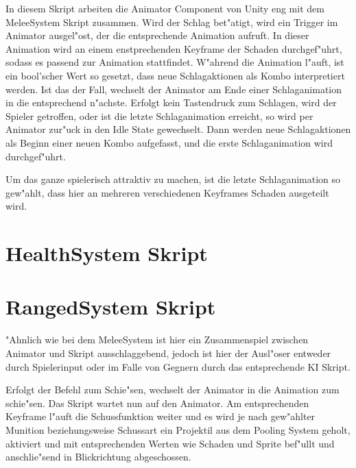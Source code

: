 In diesem Skript arbeiten die Animator Component von Unity eng mit dem MeleeSystem Skript zusammen. Wird der Schlag bet"atigt, wird ein Trigger im Animator ausgel"ost, der die entsprechende Animation aufruft. In dieser Animation wird an einem enstprechenden Keyframe der Schaden durchgef"uhrt, sodass es passend zur Animation stattfindet. W"ahrend die Animation l"auft, ist ein bool'scher Wert so gesetzt, dass neue Schlagaktionen als Kombo interpretiert werden. Ist das der Fall, wechselt der Animator am Ende einer Schlaganimation in die entsprechend n"achste. Erfolgt kein Tastendruck zum Schlagen, wird der Spieler getroffen, oder ist die letzte Schlaganimation erreicht, so wird per Animator zur"uck in den Idle State  gewechselt. Dann werden neue Schlagaktionen als Beginn einer neuen Kombo aufgefasst, und die erste Schlaganimation wird durchgef"uhrt.\newline

Um das ganze spielerisch attraktiv zu machen, ist die letzte Schlaganimation so gew"ahlt, dass hier an mehreren verschiedenen Keyframes Schaden ausgeteilt wird.


\section{HealthSystem Skript}

\section{RangedSystem Skript}
"Ahnlich wie bei dem MeleeSystem ist hier ein Zusammenspiel zwischen Animator und Skript ausschlaggebend, jedoch ist hier der Ausl"oser entweder durch Spielerinput oder im Falle von Gegnern durch das entsprechende KI Skript.\newline

Erfolgt der Befehl zum Schie"sen, wechselt der Animator in die Animation zum schie"sen. Das Skript wartet nun auf den Animator. Am entsprechenden Keyframe l"auft die Schussfunktion weiter und es wird je nach gew"ahlter Munition beziehungsweise Schussart ein Projektil aus dem Pooling System geholt, aktiviert und mit entsprechenden Werten wie Schaden und Sprite bef"ullt und anschlie"send in Blickrichtung abgeschossen.

